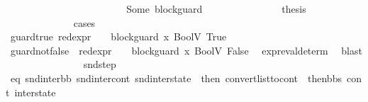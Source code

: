 \begin{isabellebody}
\ \ \ \ \ \ \ \ \ \ \isamarkupfalse%
\isanewline
\ \ \ \ \ \ \ \ \ \ \ \ \isamarkupfalse%
\ {\isacharparenleft}{\kern0pt}Some\ block{\isacharunderscore}{\kern0pt}guard{\isacharparenright}{\kern0pt}\isanewline
\ \ \ \ \ \ \ \ \ \ \ \ \isamarkupfalse%
\ \isamarkupfalse%
\ {\isacharquery}{\kern0pt}thesis\ \isanewline
\ \ \ \ \ \ \ \ \ \ \ \ \isamarkupfalse%
\ cases\isanewline
\ \ \ \ \ \ \ \ \ \ \ \ \ \ \isamarkupfalse%
\ guard{\isacharunderscore}{\kern0pt}true{\isacharcolon}{\kern0pt}\ {\isachardoublequoteopen}{\isacharparenleft}{\kern0pt}red{\isacharunderscore}{\kern0pt}expr\ {\isasymLambda}\ {\isasymGamma}\ {\isasymOmega}\ block{\isacharunderscore}{\kern0pt}guard\ x{}\ {\isacharparenleft}{\kern0pt}BoolV\ True{\isacharparenright}{\kern0pt}{\isacharparenright}{\kern0pt}{\isachardoublequoteclose}\isanewline
\ \ \ \ \ \ \ \ \ \ \ \ \ \ \isamarkupfalse%
\ guard{\isacharunderscore}{\kern0pt}not{\isacharunderscore}{\kern0pt}false{\isacharcolon}{\kern0pt}\ {\isachardoublequoteopen}{\isasymnot}\ {\isacharparenleft}{\kern0pt}red{\isacharunderscore}{\kern0pt}expr\ {\isasymLambda}\ {\isasymGamma}\ {\isasymOmega}\ block{\isacharunderscore}{\kern0pt}guard\ x{}\ {\isacharparenleft}{\kern0pt}BoolV\ False{\isacharparenright}{\kern0pt}{\isacharparenright}{\kern0pt}{\isachardoublequoteclose}\ \isamarkupfalse%
\ expr{\isacharunderscore}{\kern0pt}eval{\isacharunderscore}{\kern0pt}determ\ \isamarkupfalse%
\ blast\isanewline
\ \ \ \ \ \ \ \ \ \ \ \ \ \ \isamarkupfalse%
\ snd{\isacharunderscore}{\kern0pt}step\ \isamarkupfalse%
\ eq{\isacharcolon}{\kern0pt}\ {\isachardoublequoteopen}{\isacharparenleft}{\kern0pt}snd{\isacharunderscore}{\kern0pt}inter{\isacharunderscore}{\kern0pt}bb{\isacharcomma}{\kern0pt}\ snd{\isacharunderscore}{\kern0pt}inter{\isacharunderscore}{\kern0pt}cont{\isacharcomma}{\kern0pt}\ snd{\isacharunderscore}{\kern0pt}inter{\isacharunderscore}{\kern0pt}state{\isacharparenright}{\kern0pt}\ {\isacharequal}{\kern0pt}\ {\isacharparenleft}{\kern0pt}then{}{\isacharcomma}{\kern0pt}\ convert{\isacharunderscore}{\kern0pt}list{\isacharunderscore}{\kern0pt}to{\isacharunderscore}{\kern0pt}cont\ {\isacharparenleft}{\kern0pt}\ then{\isacharunderscore}{\kern0pt}bbs{\isacharparenright}{\kern0pt}\ cont{}{\isacharcomma}{\kern0pt}\ inter{\isacharunderscore}{\kern0pt}state{\isacharparenright}{\kern0pt}{\isachardoublequoteclose}\ \isanewline

\end{isabellebody}
